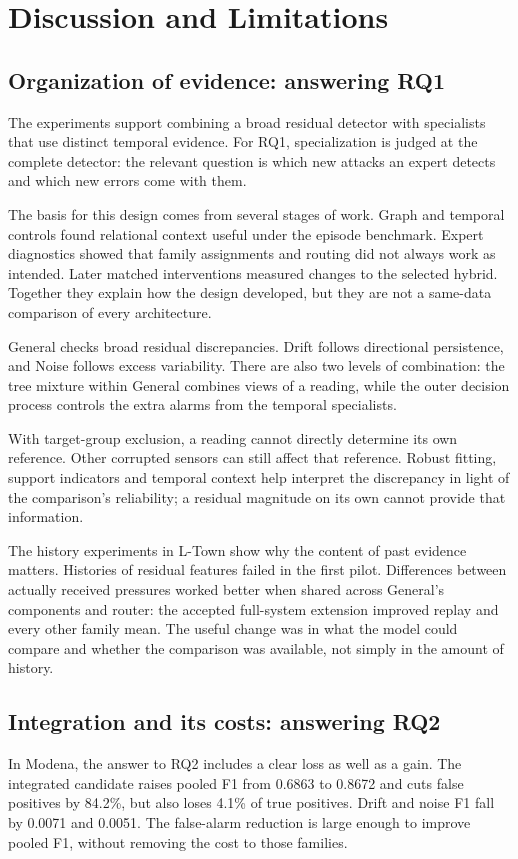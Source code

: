 \chapter{Discussion and Limitations}
\label{ch:discussion}

\section{Organization of evidence: answering RQ1}
The experiments support combining a broad residual detector with specialists that use distinct temporal evidence. For RQ1, specialization is judged at the complete detector: the relevant question is which new attacks an expert detects and which new errors come with them.

The basis for this design comes from several stages of work. Graph and temporal controls found relational context useful under the episode benchmark. Expert diagnostics showed that family assignments and routing did not always work as intended. Later matched interventions measured changes to the selected hybrid. Together they explain how the design developed, but they are not a same-data comparison of every architecture.

General checks broad residual discrepancies. Drift follows directional persistence, and Noise follows excess variability. There are also two levels of combination: the tree mixture within General combines views of a reading, while the outer decision process controls the extra alarms from the temporal specialists.

With target-group exclusion, a reading cannot directly determine its own reference. Other corrupted sensors can still affect that reference. Robust fitting, support indicators and temporal context help interpret the discrepancy in light of the comparison's reliability; a residual magnitude on its own cannot provide that information.

The history experiments in L-Town show why the content of past evidence matters. Histories of residual features failed in the first pilot. Differences between actually received pressures worked better when shared across General's components and router: the accepted full-system extension improved replay and every other family mean. The useful change was in what the model could compare and whether the comparison was available, not simply in the amount of history.

\section{Integration and its costs: answering RQ2}
In Modena, the answer to RQ2 includes a clear loss as well as a gain. The integrated candidate raises pooled F1 from 0.6863 to 0.8672 and cuts false positives by 84.2\%, but also loses 4.1\% of true positives. Drift and noise F1 fall by 0.0071 and 0.0051. The false-alarm reduction is large enough to improve pooled F1, without removing the cost to those families.

